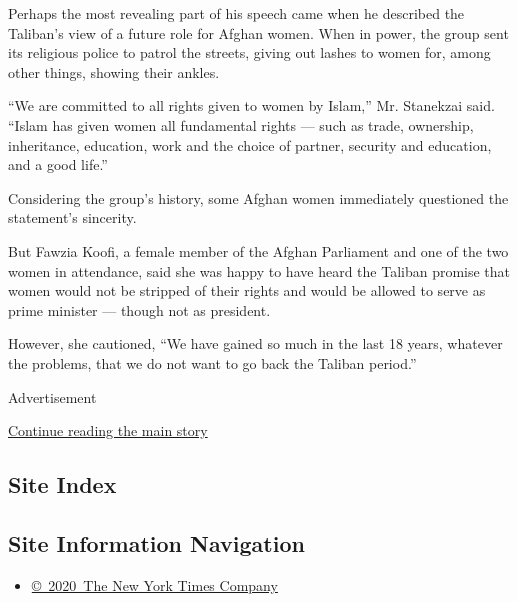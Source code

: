 Perhaps the most revealing part of his speech came when he described the
Taliban's view of a future role for Afghan women. When in power, the
group sent its religious police to patrol the streets, giving out lashes
to women for, among other things, showing their ankles.

``We are committed to all rights given to women by Islam,'' Mr.
Stanekzai said. ``Islam has given women all fundamental rights --- such
as trade, ownership, inheritance, education, work and the choice of
partner, security and education, and a good life.''

Considering the group's history, some Afghan women immediately
questioned the statement's sincerity.

But Fawzia Koofi, a female member of the Afghan Parliament and one of
the two women in attendance, said she was happy to have heard the
Taliban promise that women would not be stripped of their rights and
would be allowed to serve as prime minister --- though not as president.

However, she cautioned, ``We have gained so much in the last 18 years,
whatever the problems, that we do not want to go back the Taliban
period.''

Advertisement

\protect\hyperlink{after-bottom}{Continue reading the main story}

\hypertarget{site-index}{%
\subsection{Site Index}\label{site-index}}

\hypertarget{site-information-navigation}{%
\subsection{Site Information
Navigation}\label{site-information-navigation}}

\begin{itemize}
\tightlist
\item
  \href{https://help.nytimes.com/hc/en-us/articles/115014792127-Copyright-notice}{©~2020~The
  New York Times Company}
\end{itemize}

